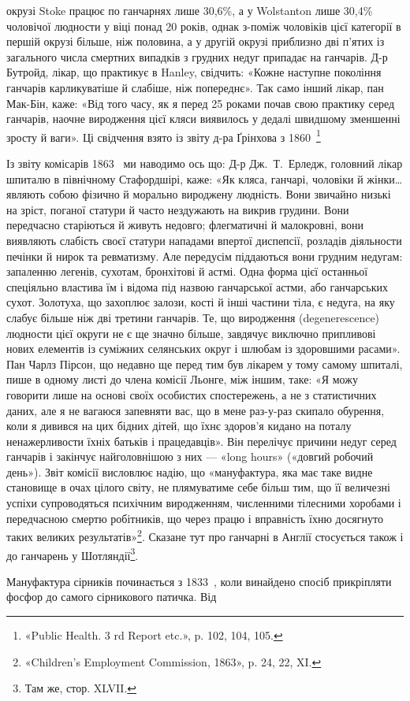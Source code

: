 \parcont{}  %
окрузі Stoke працює по ганчарнях лише 30,6\%, а у Wolstanton
лише 30,4\% чоловічої людности у віці понад 20 років, однак
з-поміж чоловіків цієї категорії в першій окрузі більше, ніж
половина, а у другій окрузі приблизно дві п’ятих із загального
числа смертних випадків з грудних недуг припадає на ганчарів.
Д-р Бутройд, лікар, що практикує в Hanley, свідчить: «Кожне
наступне покоління ганчарів карликуватіше й слабіше, ніж попереднє».
Так само інший лікар, пан Мак-Бін, каже: «Від того
часу, як я перед 25 роками почав свою практику серед ганчарів,
наочне виродження цієї кляси виявилось у дедалі швидшому
зменшенні зросту й ваги». Ці свідчення взято із звіту д-ра
Ґрінхова з 1860~\footnote{
«Public Health. 3 rd Report etc.», p. 102, 104, 105.
}

Із звіту комісарів 1863~ ми наводимо ось що: Д-р Дж.~Т.~Ерледж, головний лікар шпиталю в північному Стафордшірі,
каже: «Як кляса, ганчарі, чоловіки й жінки\dots{} являють собою
фізично й морально вироджену людність. Вони звичайно низькі
на зріст, поганої статури й часто нездужають на викрив грудини.
Вони передчасно старіються й живуть недовго; флегматичні й
малокровні, вони виявляють слабість своєї статури нападами
впертої диспепсії, розладів діяльности печінки й нирок та ревматизму.
Але передусім піддаються вони грудним недугам: запаленню
легенів, сухотам, бронхітові й астмі. Одна форма цієї
останньої спеціяльно властива їм і відома під назвою ганчарської
астми, або ганчарських сухот. Золотуха, що захоплює залози,
кості й інші частини тіла, є недуга, на яку слабує більше ніж
дві третини ганчарів. Те, що виродження (degenerescence) людности
цієї округи не є ще значно більше, завдячує виключно
припливові нових елементів із суміжних селянських округ і
шлюбам із здоровшими расами». Пан Чарлз Пірсон, що недавно
ще перед тим був лікарем у тому самому шпиталі, пише
в одному листі до члена комісії Льонге, між іншим, таке: «Я можу
говорити лише на основі своїх особистих спостережень, а не з
статистичних даних, але я не вагаюся запевняти вас, що в мене
раз-у-раз скипало обурення, коли я дивився на цих бідних
дітей, що їхнє здоров’я кидано на поталу ненажерливости їхніх
батьків і працедавців». Він перелічує причини недуг серед ганчарів
і закінчує найголовнішою з них — «long hours» («довгий
робочий день»). Звіт комісії висловлює надію, що «мануфактура,
яка має таке видне становище в очах цілого світу, не плямуватиме
себе більш тим, що її величезні успіхи супроводяться психічним
виродженням, численними тілесними хоробами і передчасною
смертю робітників, що через працю і вправність їхню
досягнуто таких великих результатів»\footnote{
«Children’s Employment Commission, 1863», p. 24, 22, XI.
}. Сказане тут про ганчарні
в Англії стосується також і до ганчарень у Шотляндії\footnote{
Там же, стор. XLVII.
}.

Мануфактура сірників починається з 1833~, коли винайдено
спосіб прикріпляти фосфор до самого сірникового патичка. Від
\parbreak{}  %
